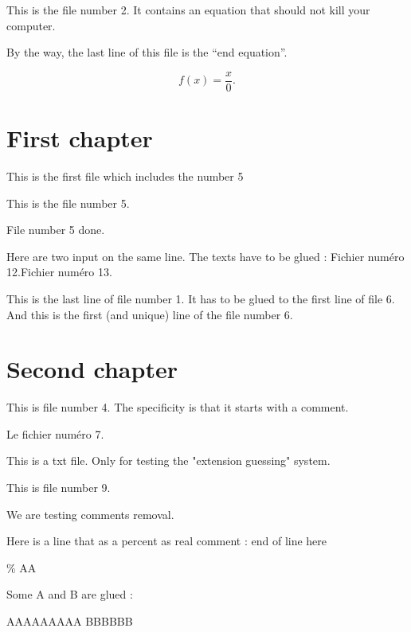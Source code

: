 \documentclass[a4paper,oneside,11pt]{book}
\begin{document}
 

 

%
%


%

    This is the file number 2. It contains an equation that should not kill your computer.

By the way, the last line of this file is the ``end equation''.

\begin{equation}
    f(x)=\frac{ x }{ 0 }.
\end{equation}%
  

\tableofcontents

\chapter{First chapter}
This is the first file which includes the number 5

This is the file number 5.      %

File number 5 done. 

Here are two input on the same line. The texts have to be glued :
Fichier numéro 12.Fichier numéro 13.

This is the last line of file number 1. It has to be glued to the first line of file 6.
And this is the first (and unique) line of the file number 6.

\chapter{Second chapter}
%

This is file number 4. The specificity is that it starts with a comment.


Le fichier numéro 7.


This is a txt file. Only for testing the "extension guessing" system.

This is file number 9.

We are testing comments removal. 

Here is a line that as a percent as real comment : end of line here%



\% \huge \normalsize AA

Some A and B are glued :

AAAAAAAAA%
BBBBBB
\end{document}
